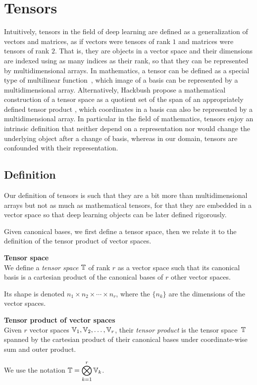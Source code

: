 \section{Tensors}

Intuitively, tensors in the field of deep learning are defined as a generalization of vectors and matrices, as if vectors were tensors of rank $1$ and matrices were tensors of rank $2$. That is, they are objects in a vector space and their dimensions are indexed using as many indices as their rank, so that they can be represented by multidimensional arrays. In mathematics, a tensor can be defined as a special type of multilinear function~\citep{bass1968cours, marcus1975finite, williamson2015tensor}, which image of a basis can be represented by a multidimensional array. Alternatively, Hackbush propose a mathematical construction of a tensor space as a quotient set of the span of an appropriately defined tensor product \citep{hackbusch2012tensor}, which coordinates in a basis can also be represented by a multidimensional array. In particular in the field of mathematics, tensors enjoy an intrinsic definition that neither depend on a representation nor would change the underlying object after a change of basis, whereas in our domain, tensors are confounded with their representation.

\subsection{Definition}

Our definition of tensors is such that they are a bit more than multidimensional arrays but not as much as mathematical tensors, for that they are embedded in a vector space so that deep learning objects can be later defined rigorously.

Given canonical bases, we first define a tensor space, then we relate it to the definition of the tensor product of vector spaces.

\begin{definition}\textbf{Tensor space}\\
We define a \emph{tensor space} $\mathbb{T}$ of rank $r$ as a vector space such that its canonical basis is a cartesian product of the canonical bases of $r$ other vector spaces.

Its shape is denoted $n_1 \times n_2 \times \cdots \times n_r$, where the $\{n_k\}$ are the dimensions of the vector spaces.
\end{definition}

\begin{definition}\textbf{Tensor product of vector spaces}\\
Given $r$ vector spaces $\mathbb{V}_1, \mathbb{V}_2, \ldots, \mathbb{V}_r$, their \emph{tensor product} is the tensor space~$\mathbb{T}$ spanned by the cartesian product of their canonical bases under coordinate-wise sum and outer product.

We use the notation $\mathbb{T} = \displaystyle \bigotimes_{k=1}^r \mathbb{V}_k$.
\end{definition}

